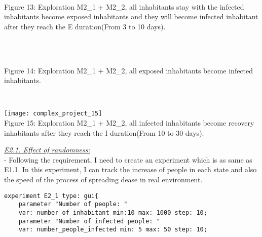 \documentclass{article}
\begin{document}
\begin{pic13}
\\
\caption{Figure 13: Exploration M2\_1 + M2\_2, all inhabitants stay with the infected inhabitants become exposed inhabitants and they will become infected inhabitant after they reach the E duration(From 3 to 10 days).} 
\end{pic13}
\\
\begin{pic14}
\\
\caption{Figure 14: Exploration M2\_1 + M2\_2, all exposed inhabitants become infected inhabitants.} 
\end{pic14}
\\
\begin{pic15}
\texttt{[image: complex\_project\_15]}
\\
\caption{Figure 15: Exploration M2\_1 + M2\_2, all infected inhabitants become recovery inhabitants after they reach the I duration(From 10 to 30 days).} 
\begin{pic15}
\newpage
\underline{\textit{E2.1. Effect of randomness:}}
\\- Following the requirement, I need to create an experiment which is as same as E1.1. In this experiment, I can track the increase of people in each state and also the speed of the process of spreading dease in real environment.
\begin{tcolorbox}
\begin{lstlisting}
experiment E2_1 type: gui{
	parameter "Number of people: " 
	var: number_of_inhabitant min:10 max: 1000 step: 10;
	parameter "Number of infected people: " 
	var: number_people_infected min: 5 max: 50 step: 10;
	

\end{lstlisting}
\end{tcolorbox}
\end{pic15}
\end{pic15}
\end{document}
